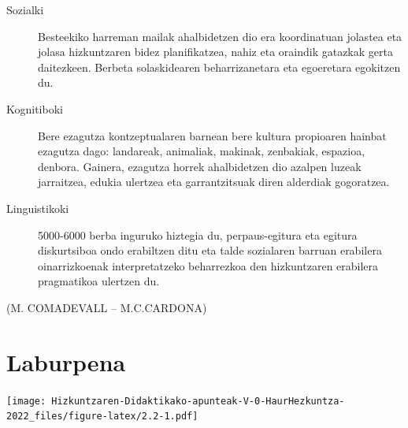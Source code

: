 \documentclass[
]{book}
\begin{document}
\begin{description}
\item[Sozialki]
Besteekiko harreman mailak ahalbidetzen dio era koordinatuan jolastea eta jolasa hizkuntzaren bidez planifikatzea, nahiz eta oraindik gatazkak gerta daitezkeen. Berbeta solaskidearen beharrizanetara eta egoeretara egokitzen du.
\item[Kognitiboki]
Bere ezagutza kontzeptualaren barnean bere kultura propioaren hainbat ezagutza dago: landareak, animaliak, makinak, zenbakiak, espazioa, denbora. Gainera, ezagutza horrek ahalbidetzen dio azalpen luzeak jarraitzea, edukia ulertzea eta garrantzitsuak diren alderdiak gogoratzea.
\item[Linguistikoki]
5000-6000 berba inguruko hiztegia du, perpaus-egitura eta egitura diskurtsiboa ondo erabiltzen ditu eta talde sozialaren barruan erabilera oinarrizkoenak interpretatzeko beharrezkoa den hizkuntzaren erabilera pragmatikoa ulertzen du.
\end{description}

(M. COMADEVALL -- M.C.CARDONA)

\hypertarget{laburpena}{%
\section{Laburpena}\label{laburpena}}

\texttt{[image: Hizkuntzaren-Didaktikako-apunteak-V-0-HaurHezkuntza-2022\_files/figure-latex/2.2-1.pdf]}
\end{document}
